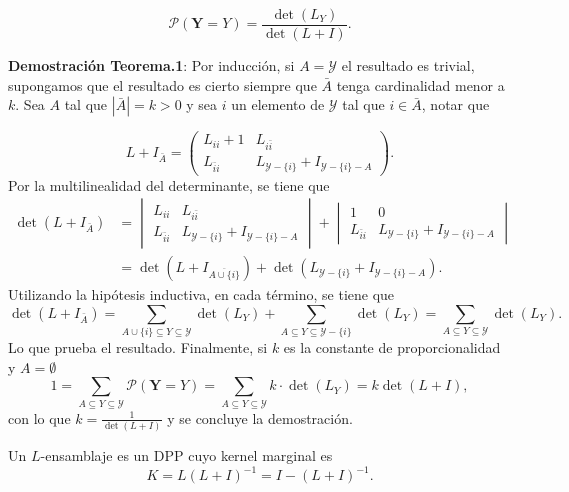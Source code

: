 \begin{appendixs}
\begin{teo}
    \[ \mathcal{P}(\mathbf{Y} = Y) = \frac{\det(L_Y)}{\det(L+I)} . \]
    \end{teo}
    
    \textbf{Demostración Teorema.1}: 
    Por inducción, si $A = \mathcal{Y}$ el resultado es trivial, supongamos que el resultado es cierto siempre que $\bar{A}$ tenga cardinalidad menor a $k$. Sea $A$ tal que $|\bar{A}| = k > 0$ y sea $i$ un elemento de $\mathcal{Y}$ tal que $i \in \bar{A}$, notar que 
    
    \[
    L + I_{\bar{A}} = 
    \begin{pmatrix}
    L_{ii}+1 & L_{i\bar{i}} \\ 
    L_{\bar{i}i} & L_{\mathcal{Y}-\{ i \}} + I_{\mathcal{Y} - \{ i \} - A} 
    \end{pmatrix} .
    \]
    Por la multilinealidad del determinante, se tiene que 
    \begin{align*}
    \det(L + I_{\bar{A}}) & = 
    \begin{vmatrix}
    L_{ii} & L_{i\bar{i}} \\ 
    L_{\bar{i}i} & L_{\mathcal{Y}-\{ i \}} + I_{\mathcal{Y} - \{ i \} - A}  
    \end{vmatrix} +
    \begin{vmatrix}
    1 & 0 \\ 
    L_{\bar{i}i} & L_{\mathcal{Y}-\{ i \}} + I_{\mathcal{Y} - \{ i \} - A}  
    \end{vmatrix} \\
    & = \det(L + I_{\overline{A \cup \{i \}}}) + \det(L_{\mathcal{Y} - \{i\}} + I_{\mathcal{Y}-\{i\}-A}) .
    \end{align*}
    Utilizando la hipótesis inductiva, en cada término, se tiene que 
    \[
    \det(L + I_{\bar{A}}) = \sum_{A \cup \{i\} \subseteq Y \subseteq \mathcal{Y}} \det(L_Y) + \sum_{A \subseteq Y \subseteq \mathcal{Y} - \{ i \}} \det(L_Y) = \sum_{A \subseteq Y \subseteq \mathcal{Y}}\det(L_Y) . 
    \]
    Lo que prueba el resultado. Finalmente, si $k$ es la constante de proporcionalidad y $A = \emptyset$
    \[
    1 = \sum_{A \subseteq Y \subseteq \mathcal{Y}}\mathcal{P}(\mathbf{Y} = Y) = \sum_{A \subseteq Y \subseteq \mathcal{Y}} k \cdot \det(L_Y) = k \det(L + I) , 
    \]
    con lo que $k = \frac{1}{\det(L + I)}$ y se concluye la demostración.
    
    \begin{teo}\hypertarget{Teorema .2}{}
    Un $L$-ensamblaje es un DPP cuyo kernel marginal es 
    \[
    K = L(L+I)^{-1} = I - (L+I)^{-1} . 
    \]
    \end{teo}
    

\end{appendixs}

